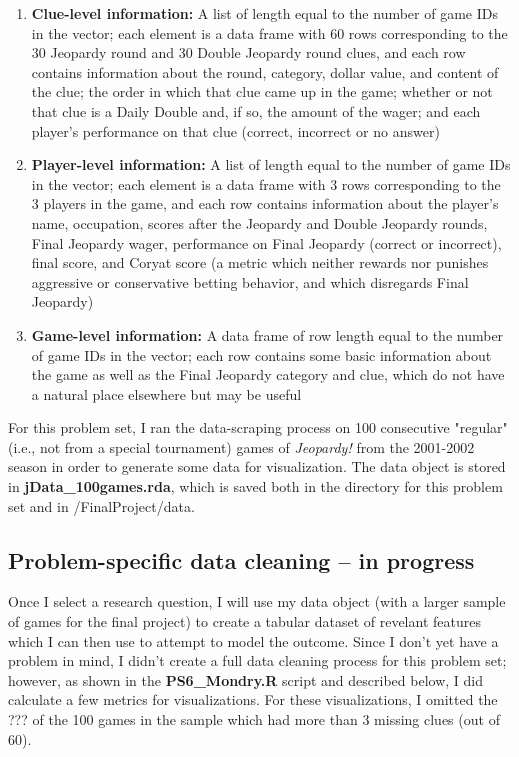 \documentclass{article}
\begin{document}
\begin{enumerate}
	
	\item \textbf{Clue-level information:} A list of length equal to the number of game IDs in the vector; each element is a data frame with 60 rows corresponding to the 30 Jeopardy round and 30 Double Jeopardy round clues, and each row contains information about the round, category, dollar value, and content of the clue; the order in which that clue came up in the game; whether or not that clue is a Daily Double and, if so, the amount of the wager; and each player's performance on that clue (correct, incorrect or no answer)
	
	\item \textbf{Player-level information:} A list of length equal to the number of game IDs in the vector; each element is a data frame with 3 rows corresponding to the 3 players in the game, and each row contains information about the player's name, occupation, scores after the Jeopardy and Double Jeopardy rounds, Final Jeopardy wager, performance on Final Jeopardy (correct or incorrect), final score, and Coryat score (a metric which neither rewards nor punishes aggressive or conservative betting behavior, and which disregards Final Jeopardy)
	
	\item \textbf{Game-level information:} A data frame of row length equal to the number of game IDs in the vector; each row contains some basic information about the game as well as the Final Jeopardy category and clue, which do not have a natural place elsewhere but may be useful
	
\end{enumerate}

For this problem set, I ran the data-scraping process on 100 consecutive "regular" (i.e., not from a special tournament) games of \textit{Jeopardy!} from the 2001-2002 season in order to generate some data for visualization. The data object is stored in \textbf{jData\_100games.rda}, which is saved both in the directory for this problem set and in /FinalProject/data.

\subsection{Problem-specific data cleaning -- in progress}

Once I select a research question, I will use my data object (with a larger sample of games for the final project) to create a tabular dataset of revelant features which I can then use to attempt to model the outcome. Since I don't yet have a problem in mind, I didn't create a full data cleaning process for this problem set; however, as shown in the \textbf{PS6\_Mondry.R} script and described below, I did calculate a few metrics for visualizations. For these visualizations, I omitted the ??? of the 100 games in the sample which had more than 3 missing clues (out of 60).
\end{document}
